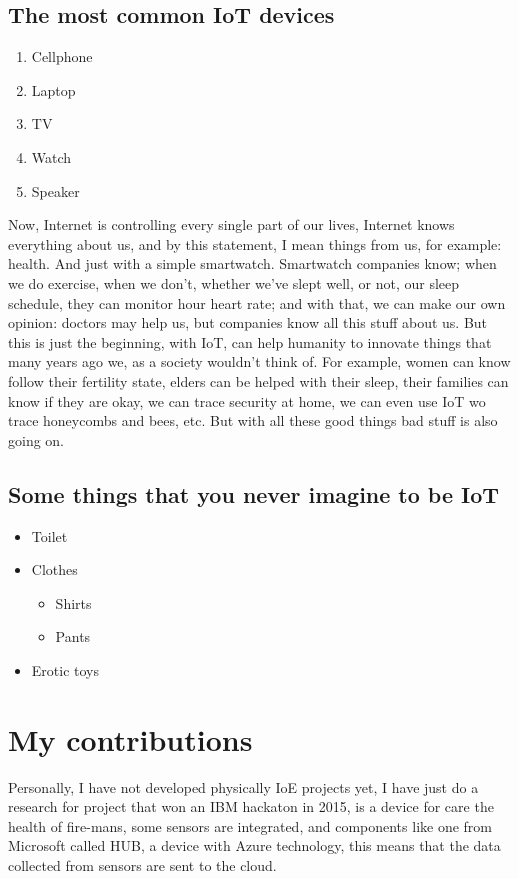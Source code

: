 \documentclass{IEEEtran}
\begin{document}
\subsection{The most common IoT devices}
\begin{enumerate}
\item Cellphone
\item Laptop
\item TV
\item Watch
\item Speaker
\end{enumerate}

Now, Internet is controlling every single part of our lives, Internet knows everything about us, and by this statement, I mean things from us, for example: health. And just with a simple smartwatch. Smartwatch companies know; when we do exercise, when we don’t, whether we’ve slept well, or not, our sleep schedule, they can monitor hour heart rate; and with that, we can make our own opinion: doctors may help us, but companies know all this stuff about us.
But this is just the beginning, with IoT, can help humanity to innovate things that many years ago we, as a society wouldn’t think of. For example, women can know follow their fertility state, elders can be helped with their sleep, their families can know if they are okay, we can trace security at home, we can even use IoT wo trace
honeycombs and bees, etc. But with all these good things bad stuff is also going on.

\subsection{Some things that you never imagine to be IoT}
\begin{itemize}
\item Toilet
\item Clothes
	\begin{itemize}
		\item Shirts
		\item Pants
	\end{itemize}
\item Erotic toys
\end{itemize}

\section{My contributions}
Personally, I have not developed physically IoE projects yet, I have just do a research for project that won an IBM hackaton in 2015, is a device for care the health of fire-mans, some sensors are integrated, and components like one from Microsoft called HUB, a device with Azure technology, this means that the data collected from sensors are sent to the cloud. 
\end{document}
